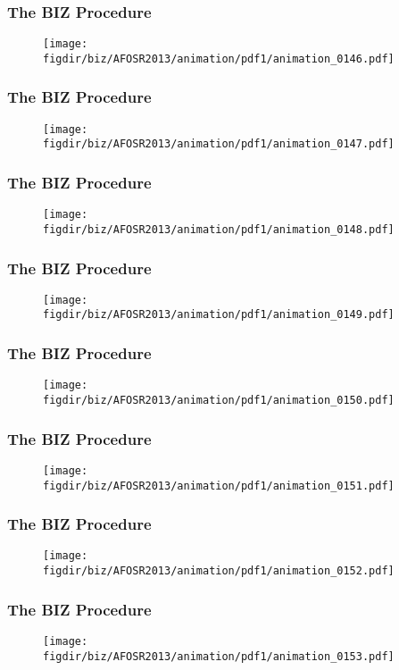 \documentclass[13pt]{beamer}
\newcommand{\figdir}{../../fig}
\begin{document}
{\begin{frame}\frametitle{The BIZ Procedure}\begin{figure}\texttt{[image: \\figdir/biz/AFOSR2013/animation/pdf1/animation\_0146.pdf]}\end{figure}\end{frame}
\begin{frame}\frametitle{The BIZ Procedure}\begin{figure}\texttt{[image: \\figdir/biz/AFOSR2013/animation/pdf1/animation\_0147.pdf]}\end{figure}\end{frame}
\begin{frame}\frametitle{The BIZ Procedure}\begin{figure}\texttt{[image: \\figdir/biz/AFOSR2013/animation/pdf1/animation\_0148.pdf]}\end{figure}\end{frame}
\begin{frame}\frametitle{The BIZ Procedure}\begin{figure}\texttt{[image: \\figdir/biz/AFOSR2013/animation/pdf1/animation\_0149.pdf]}\end{figure}\end{frame}
\begin{frame}\frametitle{The BIZ Procedure}\begin{figure}\texttt{[image: \\figdir/biz/AFOSR2013/animation/pdf1/animation\_0150.pdf]}\end{figure}\end{frame}
\begin{frame}\frametitle{The BIZ Procedure}\begin{figure}\texttt{[image: \\figdir/biz/AFOSR2013/animation/pdf1/animation\_0151.pdf]}\end{figure}\end{frame}
\begin{frame}\frametitle{The BIZ Procedure}\begin{figure}\texttt{[image: \\figdir/biz/AFOSR2013/animation/pdf1/animation\_0152.pdf]}\end{figure}\end{frame}
\begin{frame}\frametitle{The BIZ Procedure}\begin{figure}\texttt{[image: \\figdir/biz/AFOSR2013/animation/pdf1/animation\_0153.pdf]}\end{figure}\end{frame}
}
\end{document}
